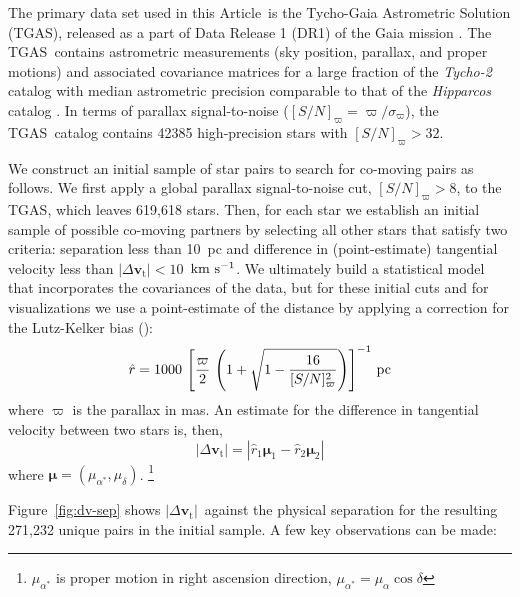 \documentclass[manuscript, letterpaper]{aastex6}
\newcommand{\project}[1]{\textsl{#1}}
\newcommand{\acronym}[1]{{\small{#1}}}
\newcommand{\documentname}{Article}
\newcommand{\dr}{\acronym{DR1}}
\newcommand{\tgas}{\acronym{TGAS}}
\newcommand{\bs}[1]{\boldsymbol{#1}}
\renewcommand{\vec}[1]{\bs{#1}}
\newcommand{\kms}{\ensuremath{\rm km~s^{-1}}}
\newcommand{\snr}{[S/N]_\varpi}
\newcommand{\absdvtan}{\ensuremath{|\Delta\vec v_\mathrm{t}|}}
\begin{document}
The primary data set used in this \documentname\ is the Tycho-Gaia Astrometric
Solution (\tgas), released as a part of Data Release 1 (\dr) of the Gaia mission
\citep{Gaia-Collaboration:2016aa,Lindegren:2016aa}.
The \tgas\ contains astrometric measurements (sky position,
parallax, and proper motions) and associated covariance matrices for a large
fraction of the \project{Tycho-2} catalog \citep{2000A&A...355L..27H} with median
astrometric precision comparable to that of the \project{Hipparcos} catalog
\citep[$\approx 0.3~{\rm mas}$;][]{2007ASSL..350.....V}. In terms of parallax
signal-to-noise ($\snr = \varpi/\sigma_\varpi$), the \tgas\ catalog contains
42385 high-precision stars with $\snr > 32$.

We construct an initial sample of star pairs to search for co-moving pairs as
follows.
We first apply a global parallax signal-to-noise cut, $\snr > 8$,  to the \tgas,
which leaves 619,618 stars.
Then, for each star we establish an initial sample of possible
co-moving partners by selecting all other stars that satisfy two criteria:
separation less than 10~pc and difference
in (point-estimate) tangential velocity less than $\absdvtan < 10$~\kms.
We ultimately build a statistical model that incorporates the covariances of the
data, but for these initial cuts and for visualizations we use a point-estimate
of the distance by applying a correction for the Lutz-Kelker bias
(\citealt{Lutz:1973aa}):
\begin{equation}
  \hat{r} = 1000 \, \left[\frac{\varpi}{2} \,
    \left(1 + \sqrt{1 - \frac{16}{\snr^2}} \right) \right]^{-1} \, {\rm pc}
    \label{eq:dist}
\end{equation}
where $\varpi$ is the parallax in mas.
An estimate for the difference in tangential velocity between two stars is,
then,
\begin{equation}
  \absdvtan = |\hat{r}_1 \vec\mu_1 - \hat{r}_2 \vec\mu_2|
\end{equation}
where $\vec\mu = (\mu_{\alpha^*}, \mu_\delta)$.
\footnote{$\mu_{\alpha^*}$ is proper motion
in right ascension direction, $\mu_{\alpha^*} = \mu_\alpha \cos\delta$}

Figure~\ref{fig:dv-sep} shows \absdvtan\ against the physical separation
for the resulting 271,232 unique pairs in the initial sample.
A few key observations can be made:
\end{document}
